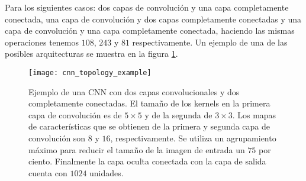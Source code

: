 Para los siguientes casos: dos capas de convolución y una capa completamente conectada, una capa de convolución y dos capas completamente conectadas y
una capa de convolución y una capa completamente conectada, haciendo las
mismas operaciones tenemos $108$, $243$ y $81$ respectivamente.
Un ejemplo de una de las posibles arquitecturas se muestra en la figura \ref{fig:cnn_topo_example}.

\begin{figure}[!ht]
\centering
\caption{Ejemplo de una CNN con dos capas convolucionales y dos completamente conectadas. El tamaño de los kernels en la primera capa de convolución es de $5 \times 5$ y de la segunda de
$3 \times 3$. Los mapas de características que se obtienen de la primera y segunda capa de convolución son $8$ y $16$, respectivamente. Se utiliza un agrupamiento máximo
para reducir el tamaño de la imagen de entrada un $75$ por ciento. Finalmente la capa oculta conectada con la capa de salida cuenta con $1024$ unidades.\label{fig:cnn_topo_example}}
\texttt{[image: cnn\_topology\_example]}
\end{figure}
%
